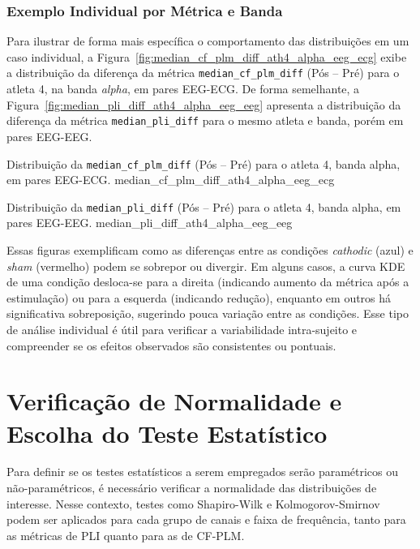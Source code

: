 \subsubsection{Exemplo Individual por Métrica e Banda}
Para ilustrar de forma mais específica o comportamento das distribuições em um caso individual, a Figura~\ref{fig:median_cf_plm_diff_ath4_alpha_eeg_ecg} exibe a distribuição da diferença da métrica \texttt{median\_cf\_plm\_diff} (Pós -- Pré) para o atleta 4, na banda \emph{alpha}, em pares EEG-ECG. De forma semelhante, a Figura~\ref{fig:median_pli_diff_ath4_alpha_eeg_eeg} apresenta a distribuição da diferença da métrica \texttt{median\_pli\_diff} para o mesmo atleta e banda, porém em pares EEG-EEG.

{Distribuição da \texttt{median\_cf\_plm\_diff} (Pós -- Pré) para o atleta 4, banda alpha, em pares EEG-ECG.}
{median_cf_plm_diff_ath4_alpha_eeg_ecg}

{Distribuição da \texttt{median\_pli\_diff} (Pós -- Pré) para o atleta 4, banda alpha, em pares EEG-EEG.}
{median_pli_diff_ath4_alpha_eeg_eeg}

Essas figuras exemplificam como as diferenças entre as condições \emph{cathodic} (azul) e \emph{sham} (vermelho) podem se sobrepor ou divergir. Em alguns casos, a curva KDE de uma condição desloca-se para a direita (indicando aumento da métrica após a estimulação) ou para a esquerda (indicando redução), enquanto em outros há significativa sobreposição, sugerindo pouca variação entre as condições. Esse tipo de análise individual é útil para verificar a variabilidade intra-sujeito e compreender se os efeitos observados são consistentes ou pontuais.

\section{Verificação de Normalidade e Escolha do Teste Estatístico}
Para definir se os testes estatísticos a serem empregados serão paramétricos ou não-paramétricos, é necessário verificar a normalidade das distribuições de interesse. Nesse contexto, testes como Shapiro-Wilk e Kolmogorov-Smirnov podem ser aplicados para cada grupo de canais e faixa de frequência, tanto para as métricas de PLI quanto para as de CF-PLM.

